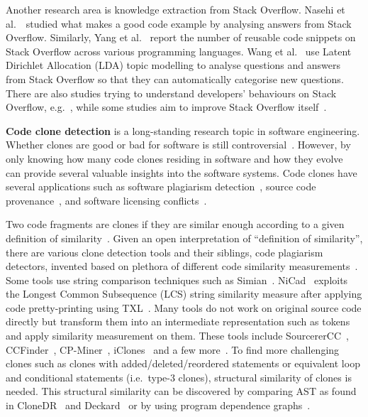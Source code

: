 \documentclass[sigconf,review, anonymous]{acmart}
\begin{document}
Another research area is knowledge extraction from Stack Overflow. Nasehi et al.~\cite{Nasehi2012}~studied what makes a good code example by analysing answers from Stack Overflow. Similarly, Yang et al.~\cite{Yang2016} report the number of reusable code snippets on Stack Overflow across various programming languages. Wang et al.~\cite{Wang2013_StackOverflow} use Latent Dirichlet Allocation (LDA) topic modelling to analyse questions and answers from Stack Overflow so that they can automatically categorise new questions. There are also studies trying to understand developers' behaviours on Stack Overflow, e.g.~\cite{Movshovitz-Attias2013,Rosen2016,Choetkiertikul2015,Bosu2013}, while some studies aim to improve Stack Overflow itself~\cite{Diamantopoulos2015, Wang2014}. 

\textbf{Code clone detection} is a long-standing research topic in software engineering. Whether clones are good or bad for software is still controversial~\cite{Sajnani2016,Kapser2003,Kapser2008,Krinke2008,Hotta2010,Gode2011,Harder2013}. However, by only knowing how many code clones residing in software and how they evolve~\cite{Pate2013,Mondal2011} can provide several valuable insights into the software systems. Code clones have several applications such as software plagiarism detection~\cite{Prechelt2002}, 
source code provenance~\cite{Davies2013}, and software licensing conflicts~\cite{German2009}.

Two code fragments are clones if they are similar enough according to a given definition of similarity~\cite{Bellon2007}. Given an open interpretation of ``definition of similarity'', there are various clone detection tools and their siblings, code plagiarism detectors, invented based on plethora of different code similarity measurements~\cite{Roy2008, Ragkhitwetsagul2016,Svajlenko2014}. Some tools
use string comparison techniques such as Simian~\cite{simian}. NiCad~\cite{Roy2008,Cordy} exploits the Longest Common Subsequence (LCS) string similarity measure after applying code pretty-printing using TXL~\cite{Cordy2006}. Many tools do not work on original source code directly but transform them into an
intermediate representation such as tokens and apply similarity
measurement on them. These tools include SourcererCC~\cite{Sajnani2016}, CCFinder~\cite{Kamiya2002},
CP-Miner~\cite{Li2006}, iClones~\cite{Gode2009} and a few more~\cite{Burrows2007, Smith2009, Duric2012, Prechelt2002, Schleimer2003}. 
To find more challenging clones such as clones with added/deleted/reordered statements or equivalent loop and conditional statements (i.e.~type-3 clones), structural similarity of clones is needed.
This structural similarity can be discovered by comparing AST as found in CloneDR~\cite{Baxter1998} and Deckard~\cite{Jiang2007a} or by using program dependence
graphs~\cite{Krinke2001,Komondoor2001}. 
\end{document}
